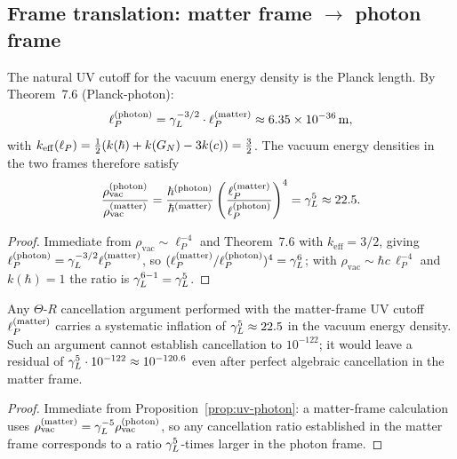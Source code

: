 \subsection{Frame translation: matter frame $\to$ photon frame}

\begin{proposition}
\label{prop:uv-photon}
The natural UV cutoff for the vacuum energy density is the Planck
length. By Theorem~7.6 (Planck-photon):
\[
 \ell_P^{(\mathrm{photon})} = \gamma_L^{-3/2}\cdot\ell_P^{(\mathrm{matter})}
 \approx 6.35\times10^{-36}\,\mathrm{m},
\]
with $k_{\mathrm{eff}}(\ell_P) = \tfrac{1}{2}(k(\hbar)+k(G_N)-3k(c))
= \tfrac{3}{2}$.
The vacuum energy densities in the two frames therefore satisfy
\begin{equation}\label{eq:rho-ratio}
 \frac{\rho_{\mathrm{vac}}^{(\mathrm{photon})}}
 {\rho_{\mathrm{vac}}^{(\mathrm{matter})}}
 = \frac{\hbar^{(\mathrm{photon})}}{\hbar^{(\mathrm{matter})}}\left(\frac{\ell_P^{(\mathrm{matter})}}{\ell_P^{(\mathrm{photon})}}\right)^4
 = \gamma_L^{5} \approx 22.5.
\end{equation}
\end{proposition}

\begin{proof}
Immediate from $\rho_{\mathrm{vac}} \sim \ell_P^{-4}$ and
Theorem~7.6 with $k_{\mathrm{eff}} = 3/2$, giving
$\ell_P^{(\mathrm{photon})} = \gamma_L^{-3/2}\ell_P^{(\mathrm{matter})}$,
so $(\ell_P^{(\mathrm{matter})}/\ell_P^{(\mathrm{photon})})^4 = \gamma_L^6$; with $\rho_{\mathrm{vac}}\sim\hbar c\,\ell_P^{-4}$ and $k(\hbar)=1$ the ratio is $\gamma_L^{6-1}=\gamma_L^5$.
\end{proof}


\begin{corollary}
\label{cor:matter-error}
Any $\Theta$-$R$ cancellation argument performed with the matter-frame
UV cutoff $\ell_P^{(\mathrm{matter})}$ carries a systematic inflation of
$\gamma_L^5 \approx 22.5$ in the vacuum energy density. Such an argument
cannot establish cancellation to $10^{-122}$; it would leave a residual
of $\gamma_L^5 \cdot 10^{-122} \approx 10^{-120.6}$ even after perfect
algebraic cancellation in the matter frame.
\end{corollary}

\begin{proof}
Immediate from Proposition~\ref{prop:uv-photon}: a matter-frame
calculation uses $\rho_{\mathrm{vac}}^{(\mathrm{matter})}
= \gamma_L^{-5}\rho_{\mathrm{vac}}^{(\mathrm{photon})}$, so any
cancellation ratio established in the matter frame corresponds to a
ratio $\gamma_L^5$-times larger in the photon frame.
\end{proof}


